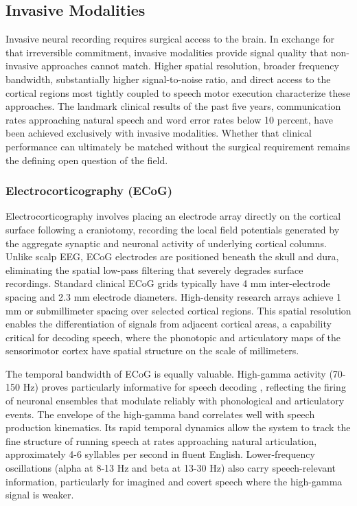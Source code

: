 \subsection{Invasive Modalities}

Invasive neural recording requires surgical access to the brain. In exchange for that irreversible commitment, invasive modalities provide signal quality that non-invasive approaches cannot match. Higher spatial resolution, broader frequency bandwidth, substantially higher signal-to-noise ratio, and direct access to the cortical regions most tightly coupled to speech motor execution characterize these approaches. The landmark clinical results of the past five years, communication rates approaching natural speech and word error rates below 10 percent, have been achieved exclusively with invasive modalities. Whether that clinical performance can ultimately be matched without the surgical requirement remains the defining open question of the field.

\subsubsection{Electrocorticography (ECoG)}

Electrocorticography involves placing an electrode array directly on the cortical surface following a craniotomy, recording the local field potentials generated by the aggregate synaptic and neuronal activity of underlying cortical columns. Unlike scalp EEG, ECoG electrodes are positioned beneath the skull and dura, eliminating the spatial low-pass filtering that severely degrades surface recordings. Standard clinical ECoG grids typically have 4 mm inter-electrode spacing and 2.3 mm electrode diameters. High-density research arrays achieve 1 mm or submillimeter spacing over selected cortical regions. This spatial resolution enables the differentiation of signals from adjacent cortical areas, a capability critical for decoding speech, where the phonotopic and articulatory maps of the sensorimotor cortex have spatial structure on the scale of millimeters.

The temporal bandwidth of ECoG is equally valuable. High-gamma activity (70-150 Hz) proves particularly informative for speech decoding \cite{Chartier2018,Ramsey2018}, reflecting the firing of neuronal ensembles that modulate reliably with phonological and articulatory events. The envelope of the high-gamma band correlates well with speech production kinematics. Its rapid temporal dynamics allow the system to track the fine structure of running speech at rates approaching natural articulation, approximately 4-6 syllables per second in fluent English. Lower-frequency oscillations (alpha at 8-13 Hz and beta at 13-30 Hz) also carry speech-relevant information, particularly for imagined and covert speech where the high-gamma signal is weaker.

